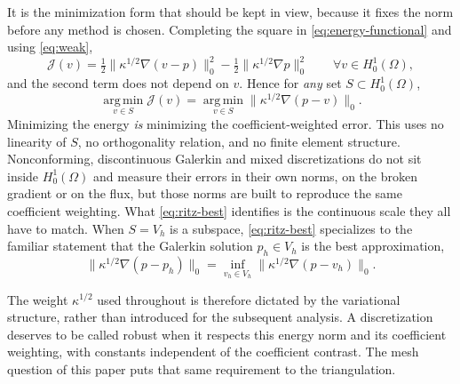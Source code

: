 \documentclass[10pt,pdftex]{amsart}%
\numberwithin{equation}{section}
\newcommand{\Jcal}{\mathcal{J}}
\begin{document}
It is the minimization form that should be kept in view, because it fixes the norm before any method is chosen.  Completing the square in \eqref{eq:energy-functional} and using \eqref{eq:weak},
\begin{equation}\label{eq:complete-square}
  \Jcal(v)=\tfrac12\bigl\|\kappa^{1/2}\nabla(v-p)\bigr\|_0^2
          -\tfrac12\bigl\|\kappa^{1/2}\nabla p\bigr\|_0^2
  \qquad\forall v\in H_0^1(\Omega),
\end{equation}
and the second term does not depend on $v$.  Hence for \emph{any} set $S\subset H_0^1(\Omega)$,
\begin{equation}\label{eq:ritz-best}
  \operatorname*{arg\,min}_{v\in S}\Jcal(v)
  =\operatorname*{arg\,min}_{v\in S}\bigl\|\kappa^{1/2}\nabla(p-v)\bigr\|_0 .
\end{equation}
Minimizing the energy \emph{is} minimizing the coefficient-weighted error.  This uses no linearity of $S$, no orthogonality relation, and no finite element structure.  Nonconforming, discontinuous Galerkin and mixed discretizations do not sit inside $H_0^1(\Omega)$ and measure their errors in their own norms, on the broken gradient or on the flux, but those norms are built to reproduce the same coefficient weighting.  What \eqref{eq:ritz-best} identifies is the continuous scale they all have to match.  When $S=V_h$ is a subspace, \eqref{eq:ritz-best} specializes to the familiar statement that the Galerkin solution $p_h\in V_h$ is the best approximation,
\begin{equation}\label{eq:best}
  \|\kappa^{1/2}\nabla(p-p_h)\|_0
  =\inf_{v_h\in V_h}\|\kappa^{1/2}\nabla(p-v_h)\|_0 .
\end{equation}

The weight $\kappa^{1/2}$ used throughout is therefore dictated by the variational structure, rather than introduced for the subsequent analysis.  A discretization deserves to be called robust when it respects this energy norm and its coefficient weighting, with constants independent of the coefficient contrast.  The mesh question of this paper puts that same requirement to the triangulation.
\end{document}
